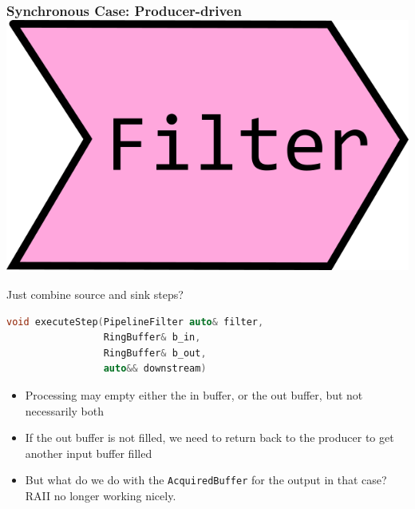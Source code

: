 \documentclass[aspectratio=169]{beamer}
\newif\iftransitions
\begin{document}
\begin{frame}[fragile]
  \frametitle{Synchronous Case: Producer-driven \hspace{180pt} \includegraphics[height=.1\textheight]{pipelinesgfx/filter.png}}

  Just combine source and sink steps?
  
\begin{lstlisting}[language={C++}]
void executeStep(PipelineFilter auto& filter,
                 RingBuffer& b_in,
                 RingBuffer& b_out,
                 auto&& downstream)
\end{lstlisting}  \iftransitions \pause \fi
  \begin{itemize}
  \item Processing may empty either the in buffer, or the out buffer, but not necessarily both  \iftransitions \pause \fi
  \item If the out buffer is not filled, we need to return back to the producer to get another input buffer filled  \iftransitions \pause \fi
  \item But what do we do with the \texttt{AcquiredBuffer} for the output in that case? RAII no longer working nicely.
  \end{itemize}

\end{frame}
\end{document}
